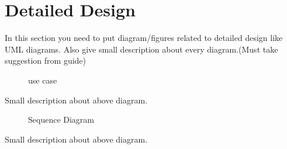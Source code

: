 \section{Detailed Design}
\hspace{5mm}In this section you need to put diagram/figures related to detailed design like UML diagrams. Also give small description about every diagram.(Must take suggestion from guide)  
\\
\begin{figure}[h!]
\begin{center}
\end{center}
\caption {use case}
\label{vmb2}
\vspace{0mm}
\end{figure}

\hspace{5mm}Small description about above diagram.

\begin{figure}[h!]
\begin{center}
\end{center}
\caption {Sequence Diagram}
\label{vmb2}
\vspace{0mm}
\end{figure}

\hspace{5mm}Small description about above diagram.

